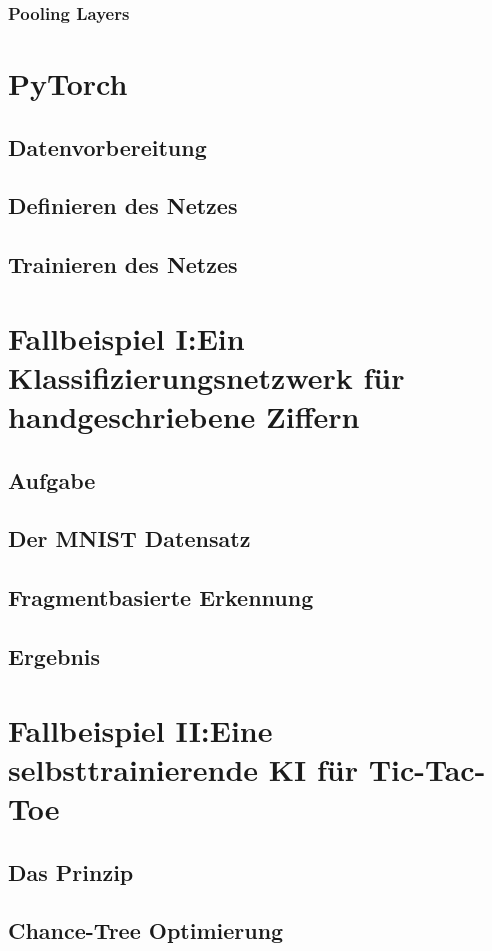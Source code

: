 \documentclass{article}
\begin{document}
\subsubsection{Pooling Layers}
\section{PyTorch}
\subsection{Datenvorbereitung}
\subsection{Definieren des Netzes}
\subsection{Trainieren des Netzes}
\section{Fallbeispiel I:\newline Ein Klassifizierungsnetzwerk für handgeschriebene Ziffern}
\subsection{Aufgabe}
\subsection{Der MNIST Datensatz}
\subsection{Fragmentbasierte Erkennung}
\subsection{Ergebnis}
\section{Fallbeispiel II:\newline Eine selbsttrainierende KI für Tic-Tac-Toe}
\subsection{Das Prinzip}
\subsection{Chance-Tree Optimierung}
\end{document}
